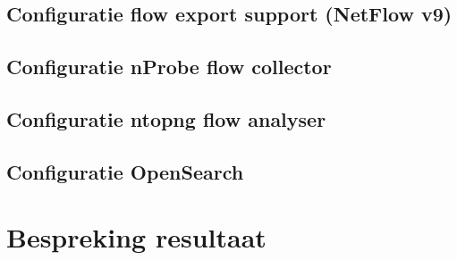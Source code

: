 \subsection{Configuratie flow export support (NetFlow v9)}

\subsection{Configuratie nProbe flow collector}

\subsection{Configuratie ntopng flow analyser}

\subsection{Configuratie OpenSearch}

\section{Bespreking resultaat}